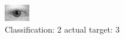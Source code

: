 \begin{figure}[h!]
\begin{center}
\includegraphics[width=0.60\columnwidth]{figures/ID524_class_2_target_3.png}
\end{center}
\caption{ Classification: 2 actual target: 3}
\label{fig:ID524_class_2_target_3}
\end{figure}
